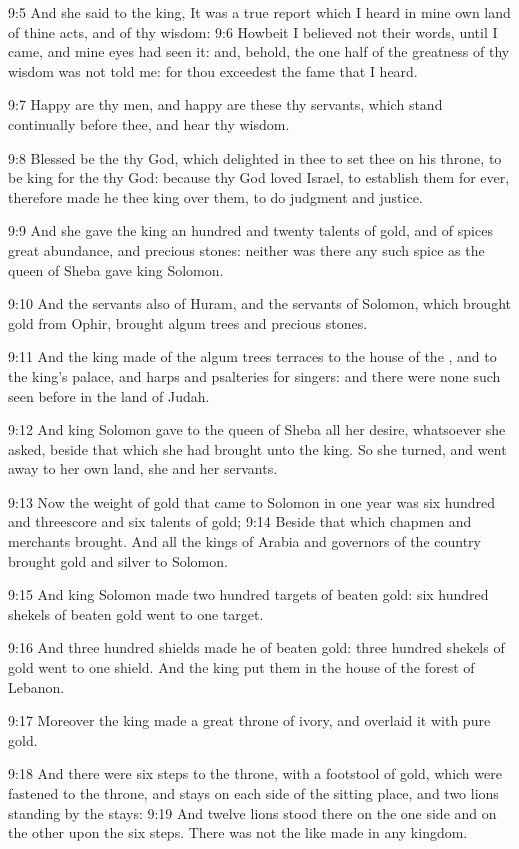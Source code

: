 9:5 And she said to the king, It was a true report which I heard in
mine own land of thine acts, and of thy wisdom: 9:6 Howbeit I believed
not their words, until I came, and mine eyes had seen it: and, behold,
the one half of the greatness of thy wisdom was not told me: for thou
exceedest the fame that I heard.

9:7 Happy are thy men, and happy are these thy servants, which stand
continually before thee, and hear thy wisdom.

9:8 Blessed be the \LORD thy God, which delighted in thee to set thee
on his throne, to be king for the \LORD thy God: because thy God loved
Israel, to establish them for ever, therefore made he thee king over
them, to do judgment and justice.

9:9 And she gave the king an hundred and twenty talents of gold, and
of spices great abundance, and precious stones: neither was there any
such spice as the queen of Sheba gave king Solomon.

9:10 And the servants also of Huram, and the servants of Solomon,
which brought gold from Ophir, brought algum trees and precious
stones.

9:11 And the king made of the algum trees terraces to the house of the
\LORD, and to the king's palace, and harps and psalteries for singers:
and there were none such seen before in the land of Judah.

9:12 And king Solomon gave to the queen of Sheba all her desire,
whatsoever she asked, beside that which she had brought unto the king.
So she turned, and went away to her own land, she and her servants.

9:13 Now the weight of gold that came to Solomon in one year was six
hundred and threescore and six talents of gold; 9:14 Beside that which
chapmen and merchants brought. And all the kings of Arabia and
governors of the country brought gold and silver to Solomon.

9:15 And king Solomon made two hundred targets of beaten gold: six
hundred shekels of beaten gold went to one target.

9:16 And three hundred shields made he of beaten gold: three hundred
shekels of gold went to one shield. And the king put them in the house
of the forest of Lebanon.

9:17 Moreover the king made a great throne of ivory, and overlaid it
with pure gold.

9:18 And there were six steps to the throne, with a footstool of gold,
which were fastened to the throne, and stays on each side of the
sitting place, and two lions standing by the stays: 9:19 And twelve
lions stood there on the one side and on the other upon the six steps.
There was not the like made in any kingdom.

